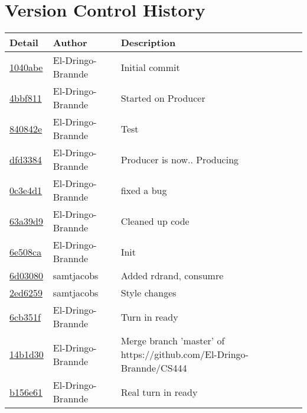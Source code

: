 \documentclass{article}
\begin{document}
    \section{Version Control History} 
    \begin{tabular}{l l l}\textbf{Detail} & \textbf{Author} & \textbf{Description}\\\hline
\href{https://github.com/El-Dringo-Brannde/CS444/commit/1040abe06276b44779d7090f4dcf3f12aa14f5ff}{1040abe} & El-Dringo-Brannde & Initial commit\\\hline
\href{https://github.com/El-Dringo-Brannde/CS444/commit/4bbf81171861f808e93ce47478cca496c0b0fe89}{4bbf811} & El-Dringo-Brannde & Started on Producer\\\hline
\href{https://github.com/El-Dringo-Brannde/CS444/commit/840842e72c16c3dd8c5a4971e0ce27ce91b65e69}{840842e} & El-Dringo-Brannde & Test\\\hline
\href{https://github.com/El-Dringo-Brannde/CS444/commit/dfd33841d968202f1a7e17cad93e5171b0686031}{dfd3384} & El-Dringo-Brannde & Producer is now.. Producing\\\hline
\href{https://github.com/El-Dringo-Brannde/CS444/commit/0c3e4d1e938f4b736ec4c0db4342038bd5dbc06a}{0c3e4d1} & El-Dringo-Brannde & fixed a bug\\\hline
\href{https://github.com/El-Dringo-Brannde/CS444/commit/63a39d9f2c3d49abb6fcdd5bfc623eb6ac356553}{63a39d9} & El-Dringo-Brannde & Cleaned up code\\\hline
\href{https://github.com/El-Dringo-Brannde/CS444/commit/6e508cad4770626bda31e3f012b218896bf1cf7c}{6e508ca} & El-Dringo-Brannde & Init\\\hline
\href{https://github.com/El-Dringo-Brannde/CS444/commit/6d030800ec382b329314ca25581e016269790a0c}{6d03080} & samtjacobs & Added rdrand, consumre\\\hline
\href{https://github.com/El-Dringo-Brannde/CS444/commit/2ed62596d4850551f192b7e5b8175e69526b1bd8}{2ed6259} & samtjacobs & Style changes\\\hline
\href{https://github.com/El-Dringo-Brannde/CS444/commit/6cb351f9c34417f60e7f8d71a179d2eb09c335b4}{6cb351f} & El-Dringo-Brannde & Turn in ready\\\hline
\href{https://github.com/El-Dringo-Brannde/CS444/commit/14b1d306e9d1f67d1826a2e3264f9e88ecc7aca2}{14b1d30} & El-Dringo-Brannde & Merge branch 'master' of https://github.com/El-Dringo-Brannde/CS444\\\hline
\href{https://github.com/El-Dringo-Brannde/CS444/commit/b156e61fdf6792555162b1e4dcd74d6cd2be8e0f}{b156e61} & El-Dringo-Brannde & Real turn in ready\\\hline

\end{tabular}
\end{document}
